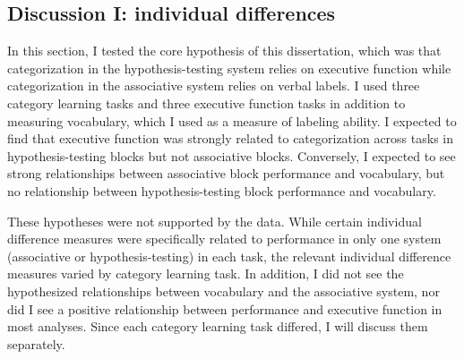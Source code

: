 \documentclass[../dissertation.tex]{subfiles}
\begin{document}
\subsection{Discussion I: individual differences}

	In this section, I tested the core hypothesis of this dissertation, which was that categorization in the hypothesis-testing system relies on executive function while categorization in the associative system relies on verbal labels. I used three category learning tasks and three executive function tasks in addition to measuring vocabulary, which I used as a measure of labeling ability. I expected to find that executive function was strongly related to categorization across tasks in hypothesis-testing blocks but not associative blocks. Conversely, I expected to see strong relationships between associative block performance and vocabulary, but no relationship between hypothesis-testing block performance and vocabulary. \par 
	These hypotheses were not supported by the data. While certain individual difference measures were specifically related to performance in only one system (associative or hypothesis-testing) in each task, the relevant individual difference measures varied by category learning task. In addition, I did not see the hypothesized relationships between vocabulary and the associative system, nor did I see a positive relationship between performance and executive function in most analyses. Since each category learning task differed, I will discuss them separately. \par
	
\end{document}
